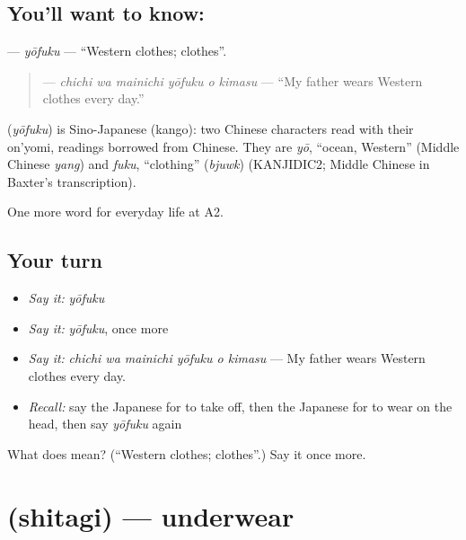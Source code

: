 \subsection*{You'll want to know: }
\textbf{} — \emph{yōfuku} — \textquotedblleft{}Western clothes; clothes\textquotedblright{}.

\begin{quote}
\textbf{   } — \emph{chichi wa mainichi yōfuku o kimasu} — \textquotedblleft{}My father wears Western clothes every day.\textquotedblright{}
\end{quote}

\begin{cousinweb}
\textbf{} (\emph{yōfuku}) is Sino-Japanese (kango): two Chinese characters read with their on'yomi, readings borrowed from Chinese. They are \emph{yō}, \textquotedblleft{}ocean, Western\textquotedblright{} (Middle Chinese \emph{yang}) and \emph{fuku}, \textquotedblleft{}clothing\textquotedblright{} (\emph{bjuwk}) (KANJIDIC2; Middle Chinese in Baxter's transcription).
\end{cousinweb}

\begin{grammarlens}[title={What you've built}]
One more word for everyday life at A2.
\end{grammarlens}

\subsection*{Your turn}
\begin{itemize}
\raggedright
  \item \emph{Say it:} \emph{yōfuku}
  \item \emph{Say it:} \emph{yōfuku}, once more
  \item \emph{Say it:} \emph{chichi wa mainichi yōfuku o kimasu} — My father wears Western clothes every day.
  \item \emph{Recall:} say the Japanese for to take off, then the Japanese for to wear on the head, then say \emph{yōfuku} again
\end{itemize}

\begin{tcolorbox}[breakable,colback=teal!4,colframe=teal!35!black,title={Before you move on}]
What does  mean? (\textquotedblleft{}Western clothes; clothes\textquotedblright{}.) Say it once more.
\end{tcolorbox}
\section[\texorpdfstring{\ja{したぎ} (shitagi)}{したぎ (shitagi)}]{ (shitagi) — underwear}

